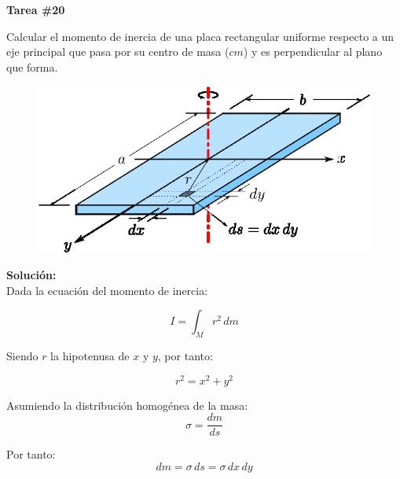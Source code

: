 \documentclass[letter,11pt]{article}
\begin{document}
\begin{center}
    {\Large \bf{Tarea \#20}}
\end{center}

Calcular el momento de inercia de una placa rectangular uniforme respecto a un
eje principal que pasa por su centro de masa ($cm$) y es perpendicular al plano
que forma.
\\

\begin{figure}[!h]
\centering
\includegraphics[scale=1.10]{resources/f1.eps}
\end{figure}

\textbf{Solución:} \\

Dada la ecuación del momento de inercia:

\begin{equation}
    I = \int_{M} r^2\, dm
\label{momentodeinercia}
\end{equation}

Siendo $r$ la hipotenusa de $x$ y $y$, por tanto:

\begin{equation}
    r^2 = x^2 + y^2
\label{pitagoras}
\end{equation}

Asumiendo la distribución homogénea de la masa:
\begin{equation*}
    \sigma = \frac{dm}{ds}
\label{densidad}
\end{equation*}

Por tanto:
\begin{equation}
    dm = \sigma\, ds = \sigma\, dx\, dy
\label{dm}
\end{equation}
\end{document}
